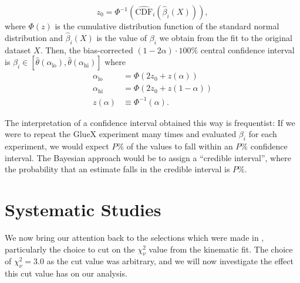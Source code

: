 \begin{equation}
  z_0 = \Phi^{-1}\left(\hat{\text{CDF}}_i(\hat{\beta}_i(X))\right),
\end{equation}
where $\Phi(z)$ is the cumulative distribution function of the standard normal distribution and $\hat{\beta}_i(X)$ is the value of $\beta_i$ we obtain from the fit to the original dataset $X$. Then, the bias-corrected $(1-2\alpha)\cdot 100\%$ central confidence interval is $\beta_i \in \left[\hat{\theta}(\alpha_\text{lo}),\hat{\theta}(\alpha_\text{hi})\right]$ where
\begin{align}
  \alpha_\text{lo} &= \Phi\left(2z_0 + z(\alpha)\right) \\
  \alpha_\text{hi} &= \Phi\left(2z_0 + z(1-\alpha)\right) \\
  z(\alpha) &\equiv \Phi^{-1}(\alpha).
\end{align}

The interpretation of a confidence interval obtained this way is frequentist: If we were to repeat the GlueX experiment many times and evaluated $\beta_i$ for each experiment, we would expect $P\%$ of the values to fall within an $P\%$ confidence interval. The Bayesian approach would be to assign a ``credible interval'', where the probability that an estimate falls in the credible interval is $P\%$.



\section{Systematic Studies}\label{sec:systematic-studies}

We now bring our attention back to the selections which were made in , particularly the choice to cut on the $\chi^2_\nu$ value from the kinematic fit. The choice of $\chi^2_\nu = 3.0$ as the cut value was arbitrary, and we will now investigate the effect this cut value has on our analysis.

